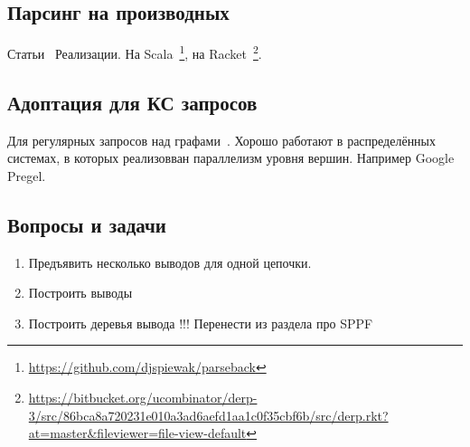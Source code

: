 \subsection{Парсинг на производных}

Статьи~\cite{DBLP:journals/corr/abs-1010-5023,Adams:2016:CPP:2908080.2908128,Might:2011:PDF:2034574.2034801,andersenparsing}
Реализации.
На Scala~\footnote{\url{https://github.com/djspiewak/parseback}}, на Racket~\footnote{\url{https://bitbucket.org/ucombinator/derp-3/src/86bca8a720231e010a3ad6aefd1aa1c0f35cbf6b/src/derp.rkt?at=master&fileviewer=file-view-default}}.

\subsection{Адоптация для КС запросов}

Для регулярных запросов над графами~\cite{Nole:2016:RPQ:2949689.2949711}.
Хорошо работают в распределённых системах, в которых реализовван параллелизм уровня вершин. 
Например Google Pregel.



\subsection{Вопросы и задачи}
\begin{enumerate}
  \item Предъявить несколько выводов для одной цепочки.
  \item Построить выводы
  \item Построить деревья вывода !!! Перенести из раздела про SPPF
\end{enumerate}

